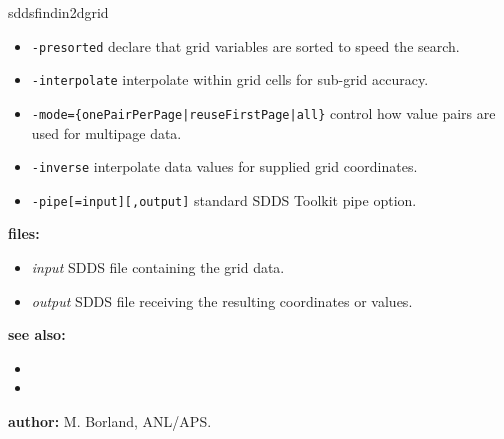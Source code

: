 \begin{sddsprog}{sddsfindin2dgrid}
\begin{itemize}
    \item \verb|-presorted| \textendash{} declare that grid variables are sorted to speed the search.
    \item \verb|-interpolate| \textendash{} interpolate within grid cells for sub-grid accuracy.
    \item \verb+-mode={onePairPerPage|reuseFirstPage|all}+ \textendash{} control how value pairs are used for multipage data.
    \item \verb|-inverse| \textendash{} interpolate data values for supplied grid coordinates.
    \item \verb+-pipe[=input][,output]+ \textendash{} standard SDDS Toolkit pipe option.
  \end{itemize}
  \item \textbf{files:}
  \begin{itemize}
    \item \emph{input} \textendash{} SDDS file containing the grid data.
    \item \emph{output} \textendash{} SDDS file receiving the resulting coordinates or values.
  \end{itemize}
  \item \textbf{see also:}
  \begin{itemize}
    \item {}
    \item {}
  \end{itemize}
  \item \textbf{author:} M. Borland, ANL/APS.
\end{sddsprog}
